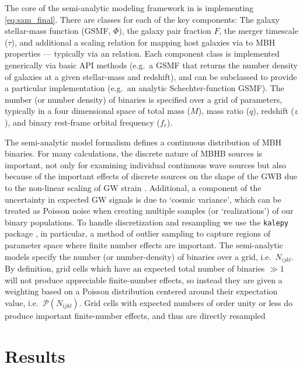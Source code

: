         The core of the semi-analytic modeling framework in \holodeck{} is implementing \eqref{eq:sam_final}.  There are classes for each of the key components: The galaxy stellar-mass function (GSMF, $\Phi$), the galaxy pair fraction \(F\), the merger timescale ($\tau$), and additional a scaling relation for mapping host galaxies via to MBH properties --- typically via an \mmbulge{} relation.  Each component class is implemented generically via basic API methods (e.g.~a GSMF that returns the number density of galaxies at a given stellar-mass and redshift), and can be subclassed to provide a particular implementation (e.g.~an analytic Schechter-function GSMF).  The number (or number density) of binaries is specified over a grid of parameters, typically in a four dimensional space of total mass ($M$), mass ratio ($q$), redshift ($z$), and binary rest-frame orbital frequency ($f_r$).

        The semi-analytic model formalism defines a continuous distribution of MBH binaries.  For many calculations, the discrete nature of MBHB sources is important, not only for examining individual continuous wave sources but also because of the important effects of discrete sources on the shape of the GWB due to the non-linear scaling of GW strain \citep{Sesana+2008}.  Additional, a component of the uncertainty in expected GW signals is due to `cosmic variance', which can be treated as Poisson noise when creating multiple samples (or `realizations') of our binary populations.  To handle discretization and resampling we use the \texttt{kalepy} package \citep{kalepy2021}, in particular, a method of outlier sampling to capture regions of parameter space where finite number effects are important.  The \holodeck{} semi-analytic models specify the number (or number-density) of binaries over a grid, i.e.~$N_{ijkl}$.  By definition, grid cells which have an expected total number of binaries $\gg 1$ will not produce appreciable finite-number effects, so instead they are given a weighting based on a Poisson distribution centered around their expectation value, i.e.~$\mathcal{P}(N_{ijkl})$.  Grid cells with expected numbers of order unity or less do produce important finite-number effects, and thus are directly resampled

\section{Results}
    \label{sec:res}

